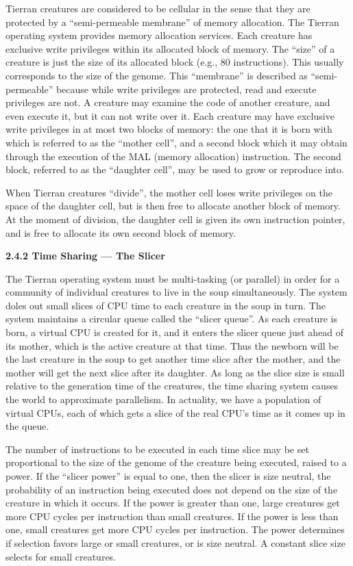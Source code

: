 Tierran creatures are considered to be cellular in the sense that they are
protected by a ``semi-permeable membrane'' of memory allocation.  The Tierran
operating system provides memory allocation services.  Each creature has
exclusive write privileges within its allocated block of memory.  The ``size''
of a creature is just the size of its allocated block (e.g., 80 instructions).
This usually corresponds to the size of the genome.  This ``membrane'' is
described as ``semi-permeable'' because
while write privileges are protected, read and execute privileges are not.
A creature may examine the code of another creature, and even execute it,
but it can not write over it.  Each creature may have exclusive write
privileges in at most two blocks of memory: the one that it is born with
which is referred to as the ``mother cell'', and a second block which it
may obtain through the execution of the MAL (memory allocation) instruction.
The second block, referred to as the ``daughter cell'', may be used to grow
or reproduce into.

When Tierran creatures ``divide'', the mother cell loses write privileges
on the space of the daughter cell, but is then free to allocate another
block of memory.  At the moment of division, the daughter cell is given
its own instruction pointer, and is free to allocate its own second block of
memory.

\LP
\bf 2.4.2 Time Sharing --- The Slicer\rm
\eLP

The Tierran operating system must be multi-tasking (or parallel) in order for
a community of individual creatures to live in the soup simultaneously.  The
system doles out small slices of CPU time to each creature in the soup in turn.
The system maintains a circular queue called the ``slicer queue''.  As each
creature is born, a virtual CPU is created for it, and it enters the slicer
queue just ahead of its mother, which is the active creature at that time.
Thus the newborn will be the last creature in the soup to get another time
slice after the mother, and the mother will get the next slice after its
daughter.  As long as the slice size is small relative to the generation
time of the creatures, the time sharing system causes the world to approximate
parallelism.  In actuality, we have a population of virtual CPUs, each of
which gets a slice of the real CPU's time as it comes up in the queue.

The number of instructions to be executed in each time slice may be set
proportional to the size of the genome of the creature being executed, raised
to a power.  If the ``slicer power'' is equal to one, then the slicer is size
neutral, the probability of an instruction being executed does not depend on
the size of the creature in which it occurs.  If the power is greater than one,
large creatures get more CPU cycles per instruction than small creatures.
If the power is less than one, small creatures get more CPU cycles per
instruction.  The power determines if selection favors large or small
creatures, or is size neutral.  A constant slice size selects for small
creatures. 

